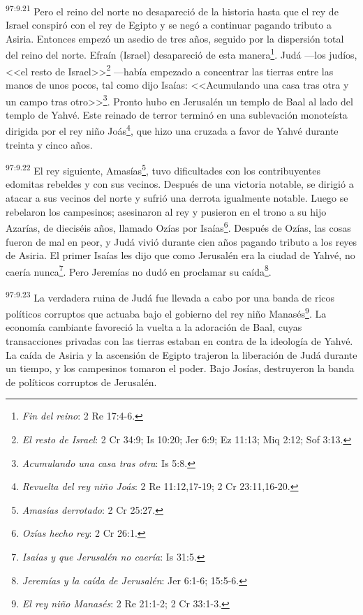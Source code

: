 \par
\textsuperscript{97:9.21} Pero el reino del norte no desapareció de la historia hasta que el rey de Israel conspiró con el rey de Egipto y se negó a continuar pagando tributo a Asiria. Entonces empezó un asedio de tres años, seguido por la dispersión total del reino del norte. Efraín (Israel) desapareció de esta manera\footnote{\textit{Fin del reino}: 2 Re 17:4-6.}. Judá ---los judíos, <<el resto de Israel>>\footnote{\textit{El resto de Israel}: 2 Cr 34:9; Is 10:20; Jer 6:9; Ez 11:13; Miq 2:12; Sof 3:13.} ---había empezado a concentrar las tierras entre las manos de unos pocos, tal como dijo Isaías: <<Acumulando una casa tras otra y un campo tras otro>>\footnote{\textit{Acumulando una casa tras otra}: Is 5:8.}. Pronto hubo en Jerusalén un templo de Baal al lado del templo de Yahvé. Este reinado de terror terminó en una sublevación monoteísta dirigida por el rey niño Joás\footnote{\textit{Revuelta del rey niño Joás}: 2 Re 11:12,17-19; 2 Cr 23:11,16-20.}, que hizo una cruzada a favor de Yahvé durante treinta y cinco años.

\par
\textsuperscript{97:9.22} El rey siguiente, Amasías\footnote{\textit{Amasías derrotado}: 2 Cr 25:27.}, tuvo dificultades con los contribuyentes edomitas rebeldes y con sus vecinos. Después de una victoria notable, se dirigió a atacar a sus vecinos del norte y sufrió una derrota igualmente notable. Luego se rebelaron los campesinos; asesinaron al rey y pusieron en el trono a su hijo Azarías, de dieciséis años, llamado Ozías por Isaías\footnote{\textit{Ozías hecho rey}: 2 Cr 26:1.}. Después de Ozías, las cosas fueron de mal en peor, y Judá vivió durante cien años pagando tributo a los reyes de Asiria. El primer Isaías les dijo que como Jerusalén era la ciudad de Yahvé, no caería nunca\footnote{\textit{Isaías y que Jerusalén no caería}: Is 31:5.}. Pero Jeremías no dudó en proclamar su caída\footnote{\textit{Jeremías y la caída de Jerusalén}: Jer 6:1-6; 15:5-6.}.

\par
\textsuperscript{97:9.23} La verdadera ruina de Judá fue llevada a cabo por una banda de ricos políticos corruptos que actuaba bajo el gobierno del rey niño Manasés\footnote{\textit{El rey niño Manasés}: 2 Re 21:1-2; 2 Cr 33:1-3.}. La economía cambiante favoreció la vuelta a la adoración de Baal, cuyas transacciones privadas con las tierras estaban en contra de la ideología de Yahvé. La caída de Asiria y la ascensión de Egipto trajeron la liberación de Judá durante un tiempo, y los campesinos tomaron el poder. Bajo Josías, destruyeron la banda de políticos corruptos de Jerusalén.

